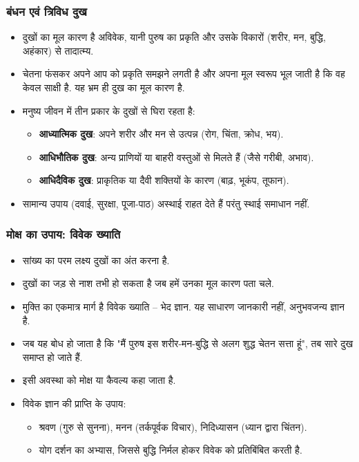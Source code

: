 \begin{frame}[fragile]\frametitle{बंधन एवं त्रिविध दुख}
      \begin{itemize}
	\item दुखों का मूल कारण है अविवेक, यानी पुरुष का प्रकृति और उसके विकारों (शरीर, मन, बुद्धि, अहंकार) से तादात्म्य.
	\item चेतना फंसकर अपने आप को प्रकृति समझने लगती है और अपना मूल स्वरूप भूल जाती है कि वह केवल साक्षी है. यह भ्रम ही दुख का मूल कारण है.
    \item मनुष्य जीवन में तीन प्रकार के दुखों से घिरा रहता है:
          \begin{itemize}
          \item \textbf{आध्यात्मिक दुख}: अपने शरीर और मन से उत्पन्न (रोग, चिंता, क्रोध, भय).
          \item \textbf{आधिभौतिक दुख}: अन्य प्राणियों या बाहरी वस्तुओं से मिलते हैं (जैसे गरीबी, अभाव).
          \item \textbf{आधिदैविक दुख}: प्राकृतिक या दैवी शक्तियों के कारण (बाढ़, भूकंप, तूफान).
          \end{itemize}
      \item सामान्य उपाय (दवाई, सुरक्षा, पूजा-पाठ) अस्थाई राहत देते हैं परंतु स्थाई समाधान नहीं.
      \end{itemize}
\end{frame}

\begin{frame}[fragile]\frametitle{मोक्ष का उपाय: विवेक ख्याति}
      \begin{itemize}
    \item सांख्य का परम लक्ष्य दुखों का अंत करना है.
	\item दुखों का जड़ से नाश तभी हो सकता है जब हमें उनका मूल कारण पता चले.
	\item मुक्ति का एकमात्र मार्ग है विवेक ख्याति – भेद ज्ञान. यह साधारण जानकारी नहीं, अनुभवजन्य ज्ञान है.
	\item जब यह बोध हो जाता है कि "मैं पुरुष इस शरीर-मन-बुद्धि से अलग शुद्ध चेतन सत्ता हूं", तब सारे दुख समाप्त हो जाते हैं.
    \item इसी अवस्था को मोक्ष या कैवल्य कहा जाता है.
	\item विवेक ज्ञान की प्राप्ति के उपाय:
        \begin{itemize}
            \item श्रवण (गुरु से सुनना), मनन (तर्कपूर्वक विचार), निदिध्यासन (ध्यान द्वारा चिंतन).
            \item योग दर्शन का अभ्यास, जिससे बुद्धि निर्मल होकर विवेक को प्रतिबिंबित करती है.
        \end{itemize}
	  \end{itemize}
\end{frame}

